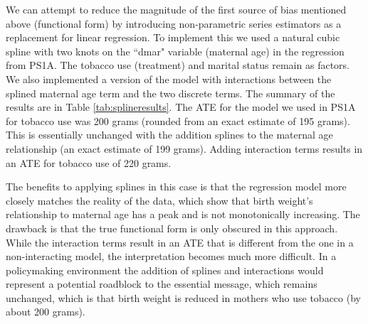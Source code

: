 \documentclass[letterpaper, 12pt]{article}
\begin{document}
We can attempt to reduce the magnitude of the first source of bias mentioned above (functional form) by introducing non-parametric series estimators as a replacement for linear regression.  To implement this we used a natural cubic spline with two knots on the ``dmar" variable (maternal age) in the regression from PS1A.  The tobacco use (treatment) and marital status remain as factors.  We also implemented a version of the model with interactions between the splined maternal age term and the two discrete terms.  The summary of the results are in Table \ref{tab:splineresults}.  The ATE for the model we used in PS1A for tobacco use was 200 grams (rounded from an exact estimate of 195 grams).  This is essentially unchanged with the addition splines to the maternal age relationship (an exact estimate of 199 grams).  Adding interaction terms results in an ATE for tobacco use of 220 grams.  

The benefits to applying splines in this case is that the regression model more closely matches the reality of the data, which show that birth weight's relationship to maternal age has a peak and is not monotonically increasing.  The drawback is that the true functional form is only obscured in this approach.  While the interaction terms result in an ATE that is different from the one in a non-interacting model, the interpretation becomes much more difficult.  In a policymaking environment the addition of splines and interactions would represent a potential roadblock to the essential message, which remains unchanged, which is that birth weight is reduced in mothers who use tobacco (by about 200 grams).  
\end{document}
